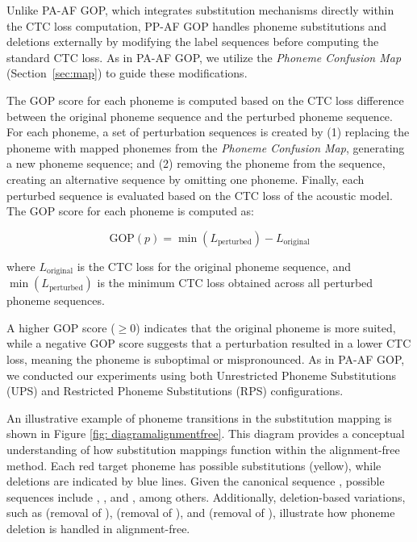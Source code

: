 \documentclass{Interspeech}
\begin{document}
Unlike PA-AF GOP, which integrates substitution mechanisms directly within the CTC loss computation, PP-AF GOP handles phoneme substitutions and deletions externally by modifying the label sequences before computing the standard CTC loss. As in PA-AF GOP, we utilize the \textit{Phoneme Confusion Map} (Section~\ref{sec:map}) to guide these modifications.

The GOP score for each phoneme is computed based on the CTC loss difference between the original phoneme sequence and the perturbed phoneme sequence. For each phoneme, a set of perturbation sequences is created by (1) replacing the phoneme with mapped phonemes from the \textit{Phoneme Confusion Map}, generating a new phoneme sequence; and
(2) removing the phoneme from the sequence, creating an alternative sequence by omitting one phoneme. Finally, each perturbed sequence is evaluated based on the CTC loss of the acoustic model. The GOP score for each phoneme is computed as:

\begin{equation}
\label{eq:eq4}
    \text{GOP}(p) = \min(L_{\text{perturbed}}) - L_{\text{original}}
\end{equation}

\noindent 
where \( L_{\text{original}} \) is the CTC loss for the original phoneme sequence, and \( \min(L_{\text{perturbed}}) \) is the minimum CTC loss obtained across all perturbed phoneme sequences.

A higher GOP score (\(\geq 0\)) indicates that the original phoneme is more suited, while a negative GOP score suggests that a perturbation resulted in a lower CTC loss, meaning the phoneme is suboptimal or mispronounced. As in PA-AF GOP, we conducted our experiments using both Unrestricted Phoneme Substitutions (UPS) and Restricted Phoneme Substitutions (RPS) configurations.


An illustrative example of phoneme transitions in the substitution mapping is shown in Figure \ref{fig: diagramalignmentfree}. This diagram provides a conceptual understanding of how substitution mappings function within the alignment-free method. Each red target phoneme has possible substitutions (yellow), while deletions are indicated by blue lines. Given the canonical sequence , possible sequences include , , and , among others. Additionally, deletion-based variations, such as  (removal of ),  (removal of ), and  (removal of ), illustrate how phoneme deletion is handled in alignment-free.
\end{document}
